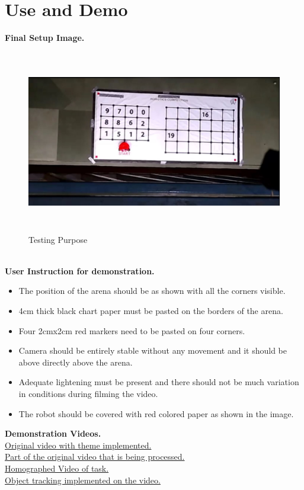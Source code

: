 \documentclass[a4paper,12pt,oneside]{book}
\begin{document}
\section{Use and Demo}
\textbf{Final Setup Image.}
    \begin{figure}[h!]
		\includegraphics[width=1\linewidth, height=8cm]{Capture.JPG}
		\centering
		\caption{Testing Purpose}
	\end{figure}\\
\textbf{User Instruction for demonstration.}
\begin{itemize}
  \item The position of the arena should be as shown with all the corners visible.
  \item 4cm thick black chart paper must be pasted on the borders of the arena.
  \item Four 2cmx2cm red markers need to be pasted on four corners.
  \item Camera should be entirely stable without any movement and it should be above directly above the arena.
  \item Adequate lightening must be present and there should not be much variation in conditions during filming the video.
  \item The robot should be covered with red colored paper as shown in the image.
\end{itemize}
\textbf{Demonstration Videos.}\\
\href{https://youtu.be/vaqDc_Qd9p8}{Original video with theme implemented.}\\
\href{https://youtu.be/ZgN-Ncc9VRw}{Part of the original video that is being processed.}\\
\href{https://youtu.be/vI5nk7CcUwI}{Homographed Video of task.}\\
\href{https://youtu.be/gpSy3z4Rkdc}{Object tracking implemented on the video.}
\end{document}
